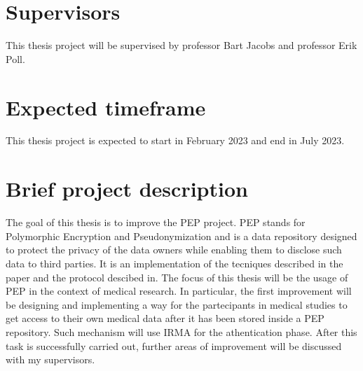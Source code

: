 \documentclass[a4paper]{report}
\begin{document}
\section{Supervisors}
This thesis project will be supervised by professor Bart Jacobs and professor Erik Poll.

\section{Expected timeframe}
This thesis project is expected to start in February 2023 and end in July 2023.

\section{Brief project description}
The goal of this thesis is to improve the PEP project\cite{pepproject}. PEP stands for Polymorphic Encryption and Pseudonymization and is a data repository designed to protect the privacy of the data owners while enabling them to disclose such data to third parties. It is an implementation of the tecniques described in the paper\cite{peppaper} and the protocol descibed in\cite{cryptoeprint}. The focus of this thesis will be the usage of PEP in the context of medical research. In particular, the first improvement will be designing and implementing a way for the partecipants in medical studies to get access to their own medical data after it has been stored inside a PEP repository. Such mechanism will use IRMA\cite{irma-app}\cite{about-irma} for the athentication phase. After this task is successfully carried out, further areas of improvement will be discussed with my supervisors.  

\printbibliography
\end{document}
